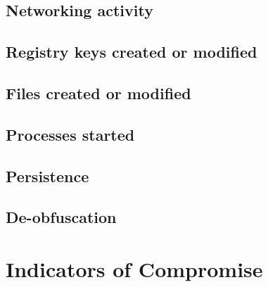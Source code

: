 \documentclass{article}
\begin{document}
    \subsection{Networking activity}
    \subsection{Registry keys created or modified}
    \subsection{Files created or modified}
    \subsection{Processes started}
    \subsection{Persistence}
    \subsection{De-obfuscation}
    \pagebreak
    \section{Indicators of Compromise}
    \pagebreak
    \printbibliography
\end{document}
